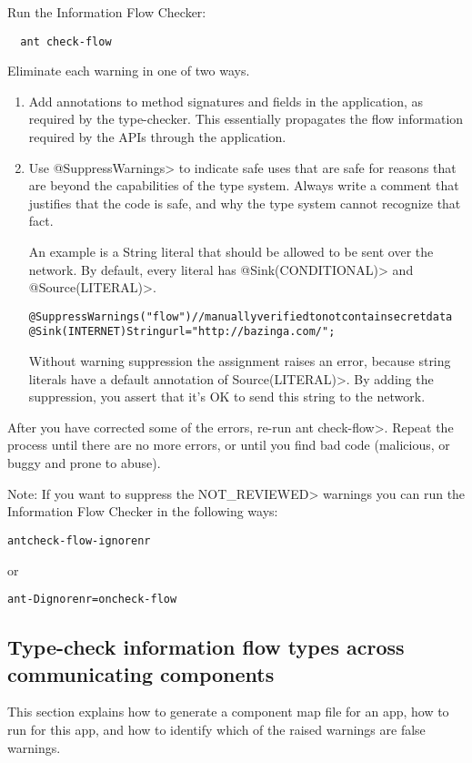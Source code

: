 Run the Information Flow Checker:

\begin{Verbatim}
  ant check-flow
\end{Verbatim}

Eliminate each warning in one of two ways.
\begin{enumerate}
\item Add annotations to method signatures and fields in the application, as
required by the type-checker. This essentially propagates the flow
information required by the APIs through the application.

\item Use \<@SuppressWarnings> to indicate safe uses that are safe for reasons
that are beyond the capabilities of the type system. Always write a
comment that justifies that the code is safe, and why the type system
cannot recognize that fact.

An example is a String literal that should be allowed to be sent
over the network. By default, every literal has \<@Sink(CONDITIONAL)> 
and \<@Source(LITERAL)>.

\begin{alltt}
    @SuppressWarnings("flow") // manually verified to not contain secret data
    @Sink(INTERNET) String url = "http://bazinga.com/";
\end{alltt}

Without warning suppression the assignment raises an error, because string literals
have a default annotation of \<Source(LITERAL)>. By adding the suppression, you
assert that it's OK to send this string to the network. 

\end{enumerate}

After you have corrected some of the errors, re-run \<ant check-flow>.
Repeat the process until there are no more errors, or until you find bad
code (malicious, or buggy and prone to abuse).

Note: If you want to suppress the \<NOT\_REVIEWED> warnings you can run the Information Flow Checker
in the following ways:

\begin{alltt}
    ant check-flow-ignorenr
\end{alltt}
or
\begin{alltt}
    ant -Dignorenr=on check-flow
\end{alltt}

\subsection{Type-check information flow types across communicating components}
This section explains how to generate a component map file for an app, how to
run \theIntentChecker{} for this app, and how to identify which of the raised
warnings are false warnings.

